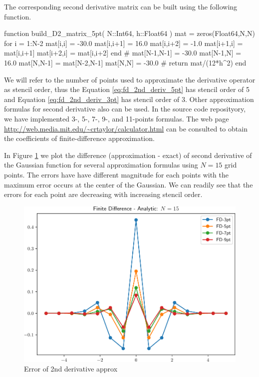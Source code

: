 The corresponding second derivative matrix can be built using the following
function.
\begin{juliacode}
function build_D2_matrix_5pt( N::Int64, h::Float64 )
    mat = zeros(Float64,N,N)
    for i = 1:N-2
        mat[i,i] = -30.0
        mat[i,i+1] = 16.0
        mat[i,i+2] = -1.0
        mat[i+1,i] = mat[i,i+1]
        mat[i+2,i] = mat[i,i+2]
    end
    #
    mat[N-1,N-1] = -30.0
    mat[N-1,N] = 16.0
    mat[N,N-1] = mat[N-2,N-1]
    mat[N,N] = -30.0
    #
    return mat/(12*h^2)
end
\end{juliacode}

We will refer to the number of points used to approximate the derivative operator as
stencil order, thus the Equation \eqref{eq:fd_2nd_deriv_5pt} has stencil order of 5
and Equation \eqref{eq:fd_2nd_deriv_3pt} has stencil order of 3.
Other approximation formulas for second derivative also can be used.
In the source code reposityory, we have implemented 3-,
5-, 7-, 9-, and 11-points formulas. The web page
{\footnotesize\url{http://web.media.mit.edu/~crtaylor/calculator.html}}
can be consulted to obtain the
coefficients of finite-difference approximation.

In Figure \ref{fig:fd_2nd_compare_N15} we plot the difference (approximation - exact)
of second derivative of
the Gaussian function for several approximation formulas using $N=15$ grid points.
The errors have have different magnitude for each points with the maximum error
occurs at the center of the Gaussian.
We can readily see that the errors for each point are decreasing with increasing stencil
order.
\begin{figure}[h]
{\center
\includegraphics[width=\textwidth]{../codes/FD1d/IMG_compare_d2_gaussian_error_15.pdf}
\par}
\caption{Error of 2nd derivative approx}
\label{fig:fd_2nd_compare_N15}
\end{figure}


